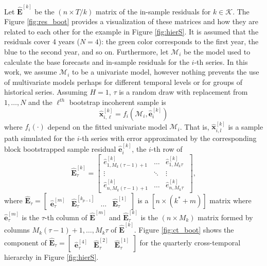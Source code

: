 \documentclass[a4paper,11pt]{article}
\newcommand{\evet}{\bm{e}}
\newcommand{\xvet}{\bm{x}}
\newcommand{\Evet}{\bm{E}}
\theoremstyle{definition}
\begin{document}
Let $\widehat{\Evet}^{[k]}$ be the $(n \times T/k)$ matrix of the in-sample residuals for $k \in \mathcal{K}$. The Figure \ref{fig:res_boot} provides a visualization of these matrices and how they are related to each other for the example in Figure \ref{fig:hierS}. It is assumed that the residuals cover 4 years ($N=4$): the green color corresponds to the first year, the blue to the second year, and so on. Furthermore, let $\mathcal{M}_i$ be the model used to calculate the base forecasts and in-sample residuals for the $i$-th series. In this work, we assume $\mathcal{M}_i$ to be a univariate model, however nothing prevents the use of multivariate models perhaps for different temporal levels or for groups of historical series. Assuming $H = 1$, $\tau$ is a random draw with replacement from $1,\dots, N$ and the $\ell^{th}$ bootstrap incoherent sample is
$$
\widehat{\xvet}_{i,\ell}^{[k]} = f_i\left(\mathcal{M}_i, \widehat{\evet}_{i}^{[k]}\right)
$$
where $f_i(\cdot)$ depend on the fitted univariate model $\mathcal{M}_i$. That is, $\widehat{\xvet}_{i,l}^{[k]}$ is a sample path simulated for the $i$-th series with error approximated by the corresponding block bootstrapped sample residual $\widehat{\evet}_{i}^{[k]}$, the $i$-th row of 
	$$
	\widehat{\Evet}^{[k]}_{\tau} = \begin{bmatrix}
		\widehat{e}^{[k]}_{1,M_k(\tau-1)+1} & \dots & \widehat{e}^{[k]}_{1,M_k\tau} \\
		\vdots & \ddots & \vdots \\
		\widehat{e}^{[k]}_{n,M_k(\tau-1)+1} & \dots & \widehat{e}^{[k]}_{n,M_k\tau} \
	\end{bmatrix},
	$$
	where $\widehat{\Evet}_{\tau} = \begin{bmatrix}
		\widehat{\evet}^{[m]}_\tau & \widehat{\Evet}^{[k_{p-1}]}_{\tau} & \dots &\widehat{\Evet}^{[1]}_{\tau}
	\end{bmatrix}$ is a $[n \times (k^\ast + m)]$ matrix where $\widehat{\evet}^{[m]}_\tau$ is the $\tau$-th column of $\widehat{\Evet}^{[m]}$ and $\widehat{\Evet}^{[k]}_{\tau}$ is the $(n \times M_k)$ matrix formed by columns $M_k(\tau-1)+1,\dots, M_k \tau$ of $\widehat{\Evet}^{[k]}$. 	Figure \ref{fig:ct_boot} shows the component of $\widehat{\Evet}_{\tau} = \begin{bmatrix}
		\widehat{\evet}^{[4]}_\tau & \widehat{\Evet}^{[2]}_{\tau}&\widehat{\Evet}^{[1]}_{\tau}
	\end{bmatrix}$ for the quarterly cross-temporal hierarchy in Figure \ref{fig:hierS}.


\end{document}
